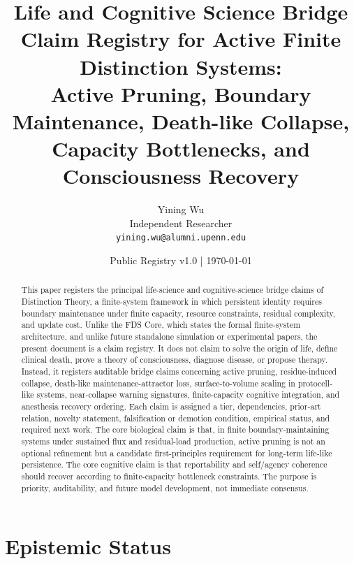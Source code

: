 \documentclass[10pt,a4paper,twocolumn,aps,prl]{revtex4-2}
\theoremstyle{claimstyle}
\theoremstyle{definition}
\newcommand{\DT}{Distinction Theory}
\newcommand{\FDS}{FDS}
\begin{document}
\title{Life and Cognitive Science Bridge Claim Registry for Active Finite Distinction Systems:\\ Active Pruning, Boundary Maintenance, Death-like Collapse, Capacity Bottlenecks, and Consciousness Recovery}

\author{Yining Wu\\
Independent Researcher\\
\texttt{yining.wu@alumni.upenn.edu}}

\date{Public Registry v1.0 | \today}

\begin{abstract}
This paper registers the principal life-science and cognitive-science bridge claims of \DT{}, a finite-system framework in which persistent identity requires boundary maintenance under finite capacity, resource constraints, residual complexity, and update cost. Unlike the \FDS{} Core, which states the formal finite-system architecture, and unlike future standalone simulation or experimental papers, the present document is a claim registry. It does not claim to solve the origin of life, define clinical death, prove a theory of consciousness, diagnose disease, or propose therapy. Instead, it registers auditable bridge claims concerning active pruning, residue-induced collapse, death-like maintenance-attractor loss, surface-to-volume scaling in protocell-like systems, near-collapse warning signatures, finite-capacity cognitive integration, and anesthesia recovery ordering. Each claim is assigned a tier, dependencies, prior-art relation, novelty statement, falsification or demotion condition, empirical status, and required next work. The core biological claim is that, in finite boundary-maintaining systems under sustained flux and residual-load production, active pruning is not an optional refinement but a candidate first-principles requirement for long-term life-like persistence. The core cognitive claim is that reportability and self/agency coherence should recover according to finite-capacity bottleneck constraints. The purpose is priority, auditability, and future model development, not immediate consensus.
\end{abstract}

\maketitle

\section*{Epistemic Status}
\end{document}
